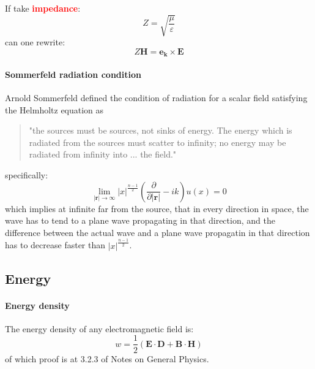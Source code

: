 \documentclass[11pt,a4paper,oneside]{book}
\begin{document}
If take \textbf{\textcolor{red}{impedance}}:\begin{equation}
	Z=\sqrt{\frac{\mu}{\varepsilon}}
\end{equation}can one rewrite:\begin{equation}
	Z\mathbf{H}=\mathbf{e}_\mathbf{k}\times \mathbf{E}
\end{equation}

\paragraph{Sommerfeld radiation condition} Arnold Sommerfeld defined the condition of radiation for a scalar field satisfying the Helmholtz equation as \begin{quotation}
  "the sources must be sources, not sinks of energy. The energy which is radiated from the sources must scatter to infinity; no energy may be radiated from infinity into ... the field."
\end{quotation}specifically:
\begin{equation}
	{\displaystyle \lim _{|\mathbf{r}|\to \infty }|x|^{\frac {n-1}{2}}\left({\frac {\partial }{\partial |\mathbf{r}|}}-ik\right)u(x)=0}
\end{equation}
which implies at infinite far from the source, that in every direction in space, the wave has to tend to a plane wave propagating in that direction, and the difference between the actual wave and a plane wave propagatin in that direction has to decrease faster than $|x|^{\frac {n-1}{2}}$.


\subsection{Energy}
\paragraph{Energy density} The energy density of any electromagnetic field is:\begin{equation}
	w=\frac{1}{2}\left(\mathbf{E}\cdot\mathbf{D}+\mathbf{B}\cdot\mathbf{H} \right)
\end{equation}
of which proof is at 3.2.3 of Notes on General Physics.
\end{document}

